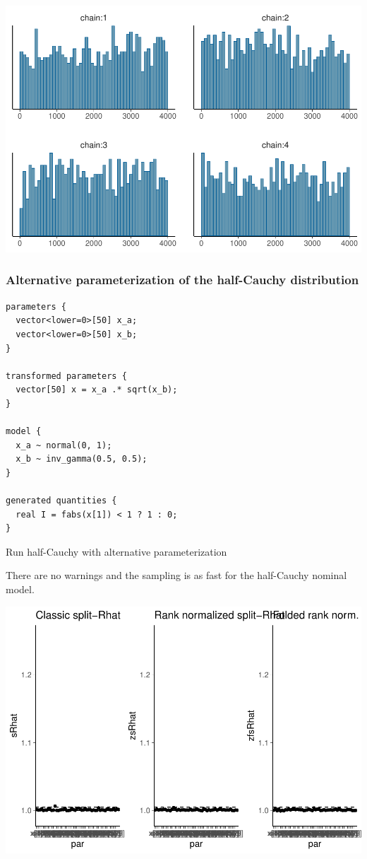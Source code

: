 \documentclass[american,]{article}
\begin{document}
\includegraphics{graphics/hist-fit-half-nom-lp-1.pdf}

\hypertarget{alternative-parameterization-of-the-half-cauchy-distribution}{%
\subsubsection*{Alternative parameterization of the half-Cauchy
distribution}\label{alternative-parameterization-of-the-half-cauchy-distribution}}

\begin{verbatim}
parameters {
  vector<lower=0>[50] x_a;
  vector<lower=0>[50] x_b;
}

transformed parameters {
  vector[50] x = x_a .* sqrt(x_b);
}

model {
  x_a ~ normal(0, 1);
  x_b ~ inv_gamma(0.5, 0.5);
}

generated quantities {
  real I = fabs(x[1]) < 1 ? 1 : 0;
}
\end{verbatim}

Run half-Cauchy with alternative parameterization

There are no warnings and the sampling is as fast for the half-Cauchy
nominal model.

\includegraphics{graphics/rhat-fit-half-reparam-1.pdf}
\end{document}
